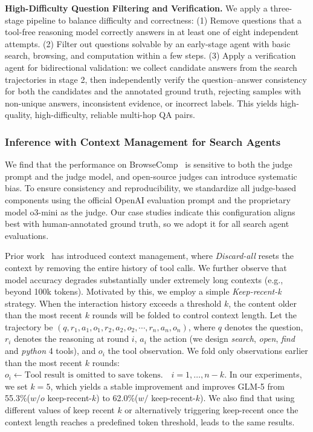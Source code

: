\documentclass{article}
\theoremstyle{definition}
\begin{document}
\textbf{High-Difficulty Question Filtering and Verification.}
We apply a three-stage pipeline to balance difficulty and correctness:
(1) Remove questions that a tool-free reasoning model correctly answers in at least one of eight independent attempts.
(2) Filter out questions solvable by an early-stage agent with basic search, browsing, and computation within a few steps. 
(3) Apply a verification agent for bidirectional validation: we collect candidate answers from the search trajectories in stage 2, then independently verify the question–answer consistency for both the candidates and the annotated ground truth, rejecting samples with non-unique answers, inconsistent evidence, or incorrect labels. 
This yields high-quality, high-difficulty, reliable multi-hop QA pairs.

\subsubsection{Inference with Context Management for Search Agents}

We find that the performance on BrowseComp~\cite{wei2025browsecomp} is sensitive to both the judge prompt and the judge model, and open-source judges can introduce systematic bias. To ensure consistency and reproducibility, we standardize all judge-based components using the official OpenAI evaluation prompt and the proprietary model o3-mini as the judge. Our case studies indicate this configuration aligns best with human-annotated ground truth, so we adopt it for all search agent evaluations.

Prior work~\citep{liu2025deepseek} has introduced context management, where \textit{Discard-all} resets the context by removing the entire history of tool calls. We further observe that model accuracy degrades substantially under extremely long contexts (e.g., beyond 100k tokens). Motivated by this, we employ a simple \textit{Keep-recent-k}  strategy. When the interaction history exceeds a threshold $k$, the content older than the most recent $k$ rounds will be folded to control context length. 
Let the trajectory be
$(q,r_1,a_1,o_1,r_2,a_2,o_2,\cdots,r_n,a_n,o_n)$, 
where $q$ denotes the question, $r_i$ denotes the reasoning at round $i$, $a_i$ the action (we design \textit{search}, \textit{open}, \textit{find} and \textit{python} 4 tools), and $o_i$ the tool observation. We fold only observations earlier than the most recent $k$ rounds:
$
    o_i \leftarrow \text{Tool result is omitted to save tokens.}\quad i=1, \ldots, n-k
$.
In our experiments, we set $k=5$, which yields a stable improvement and improves GLM-5 from 55.3\%($w/o$ keep-recent-$k$) to 62.0\%($w/$ keep-recent-$k$). We also find that using different values of keep recent $k$ or alternatively triggering keep-recent once the context length reaches a predefined token threshold, leads to the same results.
\end{document}
